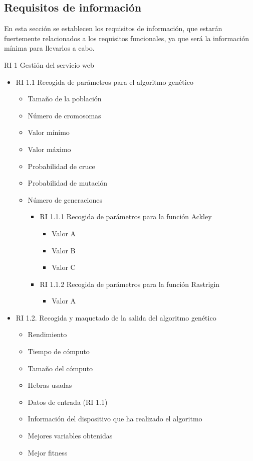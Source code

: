 \subsection{Requisitos de información}

\bigskip
En esta sección se establecen los requisitos de información, que estarán fuertemente relacionados a los requisitos funcionales, ya que será la información mínima para llevarlos a cabo.

\bigskip
RI 1 Gestión del servicio web

\begin{itemize}
	\item RI 1.1 Recogida de parámetros para el algoritmo genético

	\begin{itemize}
		\item Tamaño de la población
		\item Número de cromosomas
		\item Valor mínimo
		\item Valor máximo
		\item Probabilidad de cruce
		\item Probabilidad de mutación
		\item Número de generaciones
			\begin{itemize}
				\item RI 1.1.1 Recogida de parámetros para la función Ackley
				\begin{itemize}
					\item Valor A
					\item Valor B
					\item Valor C
				\end{itemize}
				
				\item RI 1.1.2 Recogida de parámetros para la función Rastrigin
				\begin{itemize}
					\item Valor A
				\end{itemize}
			\end{itemize}
	\end{itemize}

	\item RI 1.2. Recogida y maquetado de la salida del algoritmo genético
	\begin{itemize}
		\item Rendimiento
		\item Tiempo de cómputo
		\item Tamaño del cómputo
		\item Hebras usadas
		\item Datos de entrada (RI 1.1)
		\item Información del dispositivo que ha realizado el algoritmo
		\item Mejores variables obtenidas
		\item Mejor fitness
	\end{itemize}
	
\end{itemize}



